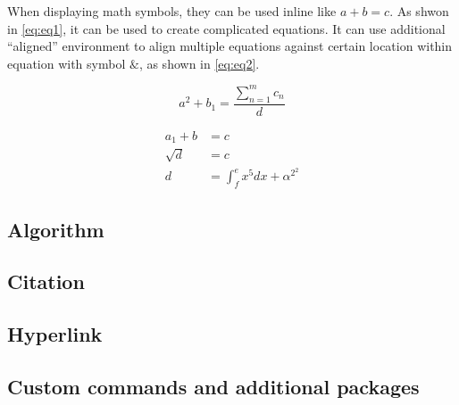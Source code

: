 When displaying math symbols, they can be used inline like $a+b=c$. As shwon in \autoref{eq:eq1}, it can be used to create complicated equations. It can use additional \enquote{aligned} environment to align multiple equations against certain location within equation with symbol $\&$, as shown in \autoref{eq:eq2}.

\begin{equation}
    a^2+b_1=\dfrac{\sum\limits^{m}_{n=1}c_n}{d}
    \label{eq:eq1}
\end{equation}


\begin{equation}
    \begin{aligned}
        a_1+b&=c \\
        \sqrt{d}&=c \\
        d&=\int^e_fx^5dx+\alpha^{2^2}
    \label{eq:eq2}
    \end{aligned}
\end{equation}


\subsection{Algorithm}
\subsection{Citation}
\subsection{Hyperlink}
\subsection{Custom commands and additional packages}

\clearpage
